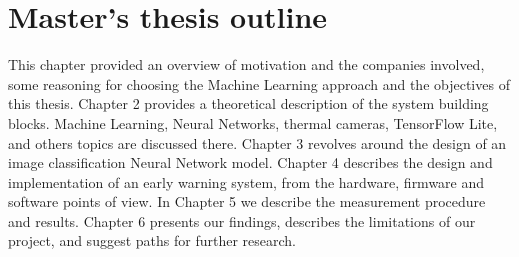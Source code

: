 \section{ Master's thesis outline}

This chapter provided an overview of motivation and the companies involved, some reasoning for choosing the Machine Learning approach and the objectives of this thesis.
Chapter 2 provides a theoretical description of the system building blocks. Machine Learning, Neural Networks, thermal cameras, TensorFlow Lite, and others topics are discussed there.
Chapter 3 revolves around the design of an image classification Neural Network model.
Chapter 4 describes the design and implementation of an early warning system, from the hardware, firmware and software points of view.
In Chapter 5 we describe the measurement procedure and results.
Chapter 6 presents our findings, describes the limitations of our project, and suggest paths for further research.

